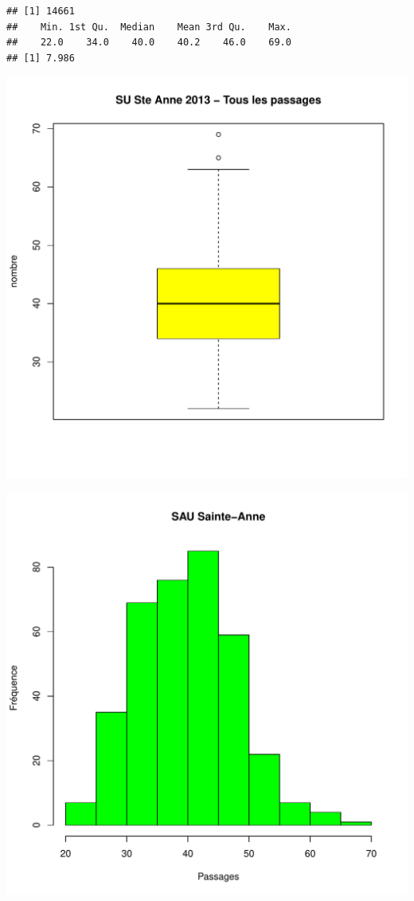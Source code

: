 \documentclass[12pt,english,french,twoside]{report}\usepackage[]{graphicx}\usepackage[]{color}
\makeatletter
\def\maxwidth{ %
  \ifdim\Gin@nat@width>\linewidth
    \linewidth
  \else
    \Gin@nat@width
  \fi
}
\newenvironment{kframe}{%
 \def\at@end@of@kframe{}%
 \ifinner\ifhmode%
  \def\at@end@of@kframe{\end{minipage}}%
  \begin{minipage}{\columnwidth}%
 \fi\fi%
 \def\FrameCommand##1{\hskip\@totalleftmargin \hskip-\fboxsep
 \colorbox{shadecolor}{##1}\hskip-\fboxsep
     \hskip-\linewidth \hskip-\@totalleftmargin \hskip\columnwidth}%
 \MakeFramed {\advance\hsize-\width
   \@totalleftmargin\z@ \linewidth\hsize
   \@setminipage}}%
 {\par\unskip\endMakeFramed%
 \at@end@of@kframe}
\newenvironment{knitrout}{}{} %
\makeatother
\begin{document}
\begin{knitrout}
\color{fgcolor}\begin{kframe}
\begin{verbatim}
## [1] 14661
##    Min. 1st Qu.  Median    Mean 3rd Qu.    Max. 
##    22.0    34.0    40.0    40.2    46.0    69.0
## [1] 7.986
\end{verbatim}
\end{kframe}
\includegraphics[width=\maxwidth]{figure/stAnne_tot_passages1} 

\includegraphics[width=\maxwidth]{figure/stAnne_tot_passages2} 

\end{knitrout}
\end{document}
